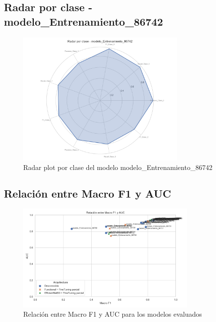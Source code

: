 \subsection{Radar por clase - modelo_Entrenamiento_86742}
\begin{figure}[H]
\centering
\includegraphics[width=0.75\textwidth]{Graficas/radar_modelo_Entrenamiento_86742.png}
\caption{Radar plot por clase del modelo modelo_Entrenamiento_86742}
\end{figure}

\subsection{Relación entre Macro F1 y AUC}
\begin{figure}[H]
\centering
\includegraphics[width=0.8\textwidth]{Graficas/scatter_f1_auc.png}
\caption{Relación entre Macro F1 y AUC para los modelos evaluados}
\end{figure}
